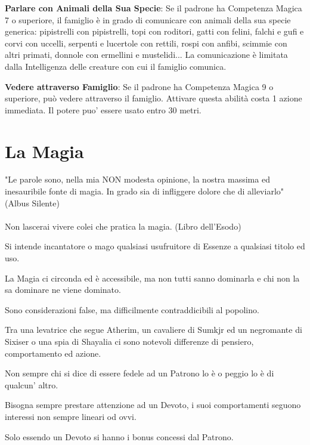 \documentclass[a4paper,11pt,twoside,openany]{book}
\begin{document}
\textbf{Parlare con Animali della Sua Specie}: Se il padrone ha Competenza Magica 7 o superiore, il famiglio è in grado di comunicare con animali della sua specie generica: pipistrelli con pipistrelli, topi con roditori, gatti con felini, falchi e gufi e corvi con uccelli, serpenti e lucertole con rettili, rospi con anfibi, scimmie con altri primati, donnole con ermellini e mustelidi... La comunicazione è limitata dalla Intelligenza delle creature con cui il famiglio comunica.

\textbf{Vedere attraverso Famiglio}: Se il padrone ha Competenza Magica 9 o superiore, può vedere attraverso il famiglio. Attivare questa abilità costa 1 azione immediata. Il potere puo' essere usato entro 30 metri.

\pagebreak

\section{La Magia}

\label{la-magia}
\begin{tcolorbox}[enhanced,arc=5pt,boxrule=0.3pt]{
	"Le parole sono, nella mia NON modesta opinione, la nostra massima ed inesauribile fonte di magia. In grado sia di infliggere dolore che di alleviarlo" (Albus Silente)\\\\
	Non lascerai vivere colei che pratica la magia. (Libro dell'Esodo)}\end{tcolorbox}\medskip

Si intende incantatore o mago qualsiasi usufruitore di Essenze a qualsiasi titolo ed uso.

La Magia ci circonda ed è accessibile, ma non tutti sanno dominarla e chi non la sa dominare ne viene dominato.

Sono considerazioni false, ma difficilmente contraddicibili al popolino.

Tra una levatrice che segue Atherim, un cavaliere di Sumkjr ed un negromante di Sixiser o una spia di Shayalia ci sono notevoli differenze di pensiero, comportamento ed azione.

Non sempre chi si dice di essere fedele ad un Patrono lo è o peggio lo è di qualcun' altro.

Bisogna sempre prestare attenzione ad un Devoto, i suoi comportamenti seguono interessi non sempre lineari od ovvi.

Solo essendo un Devoto si hanno i bonus concessi dal Patrono. 
\end{document}
